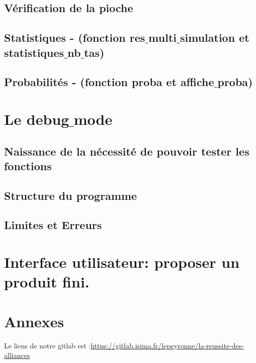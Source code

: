 \documentclass[10pt,a4paper,french,titlepage]{article}
\begin{document}
\subsection{Vérification de la pioche}
\subsection{Statistiques - (fonction res$\_$multi$\_$simulation et statistiques$\_$nb$\_$tas)}
\subsection{Probabilités - (fonction proba et affiche$\_$proba)}
\section{Le debug$\_$mode}
\subsection{Naissance de la nécessité de pouvoir tester les fonctions}
\subsection{Structure du programme}
\subsection{Limites et Erreurs}
\section{Interface utilisateur: proposer un produit fini.}
\section{Annexes}



Le liens de notre gitlab est :\url{https://gitlab.isima.fr/lepeyronne/la-reussite-des-alliances}
\end{document}
